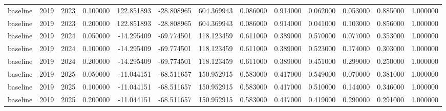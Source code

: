 \begin{tabular}{lrrrrrrrrrrrr}
baseline & 2019 & 2023 & 0.100000 & 122.851893 & -28.808965 & 604.369943 & 0.086000 & 0.914000 & 0.062000 & 0.053000 & 0.885000 & 1.000000 \\
baseline & 2019 & 2023 & 0.200000 & 122.851893 & -28.808965 & 604.369943 & 0.086000 & 0.914000 & 0.041000 & 0.103000 & 0.856000 & 1.000000 \\
baseline & 2019 & 2024 & 0.050000 & -14.295409 & -69.774501 & 118.123459 & 0.611000 & 0.389000 & 0.570000 & 0.077000 & 0.353000 & 1.000000 \\
baseline & 2019 & 2024 & 0.100000 & -14.295409 & -69.774501 & 118.123459 & 0.611000 & 0.389000 & 0.523000 & 0.174000 & 0.303000 & 1.000000 \\
baseline & 2019 & 2024 & 0.200000 & -14.295409 & -69.774501 & 118.123459 & 0.611000 & 0.389000 & 0.451000 & 0.299000 & 0.250000 & 1.000000 \\
baseline & 2019 & 2025 & 0.050000 & -11.044151 & -68.511657 & 150.952915 & 0.583000 & 0.417000 & 0.549000 & 0.070000 & 0.381000 & 1.000000 \\
baseline & 2019 & 2025 & 0.100000 & -11.044151 & -68.511657 & 150.952915 & 0.583000 & 0.417000 & 0.510000 & 0.144000 & 0.346000 & 1.000000 \\
baseline & 2019 & 2025 & 0.200000 & -11.044151 & -68.511657 & 150.952915 & 0.583000 & 0.417000 & 0.419000 & 0.290000 & 0.291000 & 1.000000 \\
\bottomrule
\end{tabular}
